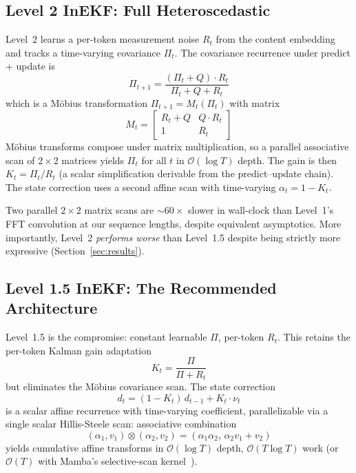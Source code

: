\subsection{Level 2 InEKF: Full Heteroscedastic}

Level~2 learns a per-token measurement noise $R_t$ from the content
embedding and tracks a time-varying covariance $\Pi_t$. The covariance
recurrence under predict + update is
\begin{equation}
  \Pi_{t+1} = \frac{(\Pi_t + Q) \cdot R_t}{\Pi_t + Q + R_t}
\end{equation}
which is a M\"obius transformation $\Pi_{t+1} = M_t(\Pi_t)$ with matrix
\begin{equation}
  M_t = \begin{bmatrix} R_t + Q & Q \cdot R_t \\ 1 & R_t \end{bmatrix}
\end{equation}
M\"obius transforms compose under matrix multiplication, so a parallel
associative scan of $2 \times 2$ matrices yields $\Pi_t$ for all $t$ in
$\mathcal{O}(\log T)$ depth. The gain is then $K_t = \Pi_t / R_t$ (a
scalar simplification derivable from the predict--update chain). The
state correction uses a second affine scan with time-varying
$\alpha_t = 1 - K_t$.

Two parallel $2 \times 2$ matrix scans are $\sim 60\times$ slower in
wall-clock than Level~1's FFT convolution at our sequence lengths,
despite equivalent asymptotics. More importantly, Level~2 \emph{performs
worse} than Level~1.5 despite being strictly more expressive
(Section~\ref{sec:results}).

\subsection{Level 1.5 InEKF: The Recommended Architecture}

Level~1.5 is the compromise: constant learnable $\Pi$, per-token $R_t$.
This retains the per-token Kalman gain adaptation
\begin{equation}
  K_t = \frac{\Pi}{\Pi + R_t}
\end{equation}
but eliminates the M\"obius covariance scan. The state correction
\begin{equation}
  d_t = (1 - K_t) \, d_{t-1} + K_t \cdot \nu_t
\end{equation}
is a scalar affine recurrence with time-varying coefficient,
parallelizable via a single scalar Hillis-Steele scan: associative
combination
\begin{equation}
  (\alpha_1, v_1) \otimes (\alpha_2, v_2) = (\alpha_1 \alpha_2,\, \alpha_2 v_1 + v_2)
\end{equation}
yields cumulative affine transforms in $\mathcal{O}(\log T)$ depth,
$\mathcal{O}(T \log T)$ work (or $\mathcal{O}(T)$ with Mamba's
selective-scan kernel~\citep{gu2024mamba}).

